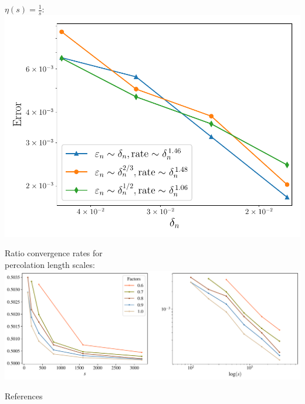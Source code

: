\begin{minipage}[b][\midHeight][t]{.31\textwidth}
\begin{minipage}{.32\textwidth}
$\eta(s)=\tfrac{1}{s}$:
\includegraphics[width=1.02\textwidth]{atelier/aronsson_star_singular_plot}
\end{minipage}%
%
\hfill%
%
\begin{minipage}{.65\textwidth}%
\small
\centering
Ratio convergence rates for\\percolation length scales:
\vskip3pt%
\includegraphics[width=\textwidth]{atelier/ratio_convergence_3d}%
\end{minipage}%
%
{\color{BaseDarkColor} References}
\AtNextBibliography{\tiny}%
\printbibliography[heading=none]


\end{minipage}